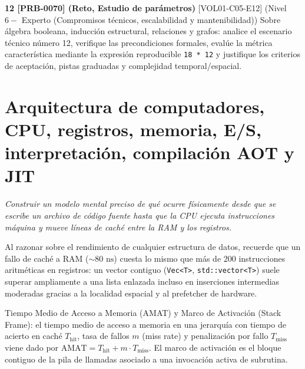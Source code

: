 \documentclass{book}
\begin{document}
\begin{tcolorbox}[title={Ejercicios}, studiumworked, breakable]
\noindent\textbf{12 [PRB-0070] (Reto, Estudio de parámetros)}
[VOL01-C05-E12] (Nivel \(6 -\) Experto (Compromisos técnicos, escalabilidad y mantenibilidad)) Sobre álgebra booleana, inducción estructural, relaciones y grafos: analice el escenario técnico número 12, verifique las precondiciones formales, evalúe la métrica característica mediante la expresión reproducible \texttt{18 * 12} y justifique los criterios de aceptación, pistas graduadas y complejidad temporal/espacial.
\end{tcolorbox}

\chapter{Arquitectura de computadores, CPU, registros, memoria, E/S, interpretación, compilación AOT y JIT}
\label{chap:cap06-arquitectura-cpu-memoria-compilacion}

\noindent\textit{Construir un modelo mental preciso de qué ocurre físicamente desde que se escribe un archivo de código fuente hasta que la CPU ejecuta instrucciones máquina y mueve líneas de caché entre la RAM y los registros.}

\begin{tcolorbox}[title={Consejo}, studiumtip, breakable]

Al razonar sobre el rendimiento de cualquier estructura de datos, recuerde que un fallo de caché a RAM (\(\sim 80\text{ ns}\)) cuesta lo mismo que más de 200 instrucciones aritméticas en registros: un vector contiguo (\texttt{Vec<T>}, \texttt{std::vector<T>}) suele superar ampliamente a una lista enlazada incluso en inserciones intermedias moderadas gracias a la localidad espacial y al prefetcher de hardware.
\end{tcolorbox}

\begin{tcolorbox}[title={Definición}, studiumdef, breakable]

Tiempo Medio de Acceso a Memoria (AMAT) y Marco de Activación (Stack Frame): el tiempo medio de acceso a memoria en una jerarquía con tiempo de acierto en caché \(T_{\text{hit}}\), tasa de fallos \(m\) (miss rate) y penalización por fallo \(T_{\text{miss}}\) viene dado por \(\text{AMAT} = T_{\text{hit}} + m \cdot T_{\text{miss}}\). El marco de activación es el bloque contiguo de la pila de llamadas asociado a una invocación activa de subrutina.
\end{tcolorbox}
\end{document}
